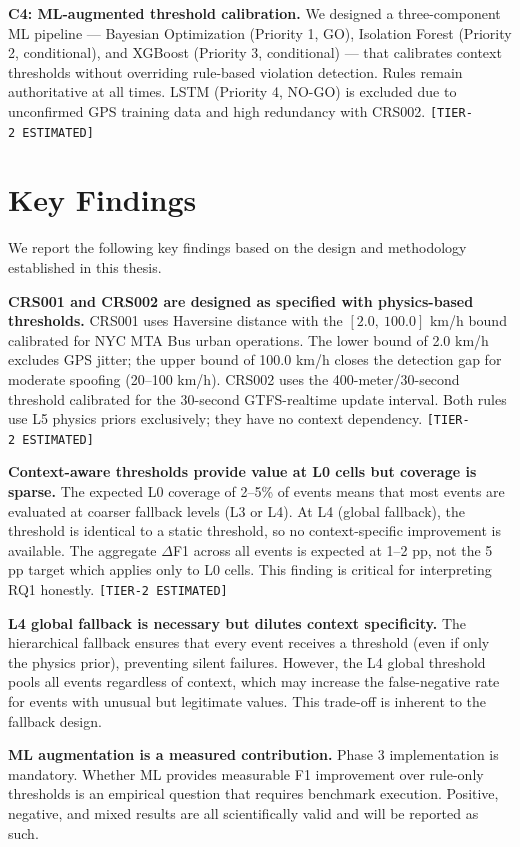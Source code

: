 \textbf{C4: ML-augmented threshold calibration.} We designed a three-component
ML pipeline — Bayesian Optimization (Priority 1, GO), Isolation Forest (Priority 2,
conditional), and XGBoost (Priority 3, conditional) — that calibrates context
thresholds without overriding rule-based violation detection. Rules remain
authoritative at all times. LSTM (Priority 4, NO-GO) is excluded due to
unconfirmed GPS training data and high redundancy with CRS002.
\texttt{[TIER-2\ ESTIMATED]}

\section{Key Findings}
\label{sec:conclusion-findings}

We report the following key findings based on the design and methodology
established in this thesis.

\textbf{CRS001 and CRS002 are designed as specified with physics-based
thresholds.} CRS001 uses Haversine distance with the $[2.0,\ 100.0]$ km/h
bound calibrated for NYC MTA Bus urban operations. The lower bound of
2.0 km/h excludes GPS jitter; the upper bound of 100.0 km/h closes the
detection gap for moderate spoofing (20--100 km/h). CRS002 uses the
400-meter/30-second threshold calibrated for the 30-second GTFS-realtime
update interval. Both rules use L5 physics priors exclusively; they have
no context dependency.
\texttt{[TIER-2\ ESTIMATED]}

\textbf{Context-aware thresholds provide value at L0 cells but coverage is
sparse.} The expected L0 coverage of 2--5\% of events means that most
events are evaluated at coarser fallback levels (L3 or L4). At L4 (global
fallback), the threshold is identical to a static threshold, so no
context-specific improvement is available. The aggregate $\Delta$F1 across
all events is expected at 1--2 pp, not the 5 pp target which applies only
to L0 cells. This finding is critical for interpreting RQ1 honestly.
\texttt{[TIER-2\ ESTIMATED]}

\textbf{L4 global fallback is necessary but dilutes context specificity.}
The hierarchical fallback ensures that every event receives a threshold
(even if only the physics prior), preventing silent failures. However, the
L4 global threshold pools all events regardless of context, which may
increase the false-negative rate for events with unusual but legitimate
values. This trade-off is inherent to the fallback design.

\textbf{ML augmentation is a measured contribution.} Phase 3 implementation
is mandatory. Whether ML provides measurable F1 improvement over rule-only
thresholds is an empirical question that requires benchmark execution.
Positive, negative, and mixed results are all scientifically valid and
will be reported as such.

